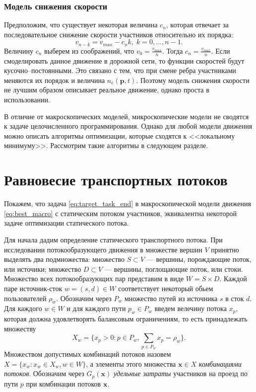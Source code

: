 \documentclass[12pt, a4paper]{article}
\begin{document}
\subsubsection*{Модель снижения скорости}

Предположим, что существует некоторая величина $c_n$, которая отвечает за последовательное снижение скорости участников относительно их порядка:
$$v_{n - k} = v_{max} - c_n k, \; k = 0, \dots, n - 1.$$
Величину $c_n$ выберем из соображений, что $v_0 = \frac{v_{max}}{n}$. Тогда $c_n = \frac{v_{max}}{n}$. Если смоделировать данное движение в дорожной сети, то функции скоростей будут кусочно--постоянными. Это связано с тем, что при смене ребра участниками меняются их порядок и величина $n_e(\textbf{p}, t)$. Поэтому модель снижения скорости не лучшим образом описывает реальное движение, однако проста в использовании.

В отличие от макроскопических моделей, микроскопические модели не сводятся к задаче целочисленного программирования. Однако для любой модели движения можно описать алгоритмы оптимизации, которые сходятся к <<локальному минимуму>>. Рассмотрим такие алгоритмы в следующем разделе.

\newpage
\section{Равновесие транспортных потоков}
\label{sec:rovn}
Покажем, что задача \eqref{eq:target_task_end} в макроскопической модели движения \eqref{eq:best_macro} с статическим потоком участников, эквивалентна некоторой задаче оптимизации статического потока.

Для начала дадим определение статического транспортного потока.
При исследовании потокообразующего движения в множестве вершин $V$ принятно выделять два подмножества: 
множество $S \subset V$ --- вершины, порождающие поток, или источики; множество $D \subset V$ --- вершины, поглощающие поток, или стоки. Множество всех потокообразующих пар представим в виде $W = S \times D$. Каждой паре источник-сток  $w = (s, d) \in W$ соответствует некоторый обьем пользователей $\rho_w$. Обозначим через $P_w$ множество путей из источника $s$ в сток $d$. Для каждого $w \in W$ и для каждого пути $p_w \in P_w$ введем велечину потока $x_p$, которая должна удовлетворять балансовым ограничениям, то есть принадлежать множеству
$$X_w = \{x_p > 0 : p \in P_w, \sum\limits_{p \in P_w} x_p = \rho_w\}.$$
Множеством допустимых комбинаций потоков назовем  $X = \{x_w: x_w \in X_w, w \in W\}$, а элементы этого множества $\textbf{x} \in X$ \textit{комбинациями потоков}. Обозначим через $G_p (\textbf{x})$ \textit{удельные затраты} участников на проезд по пути $p$ при комбинации потоков $\textbf{x}$.
\end{document}
